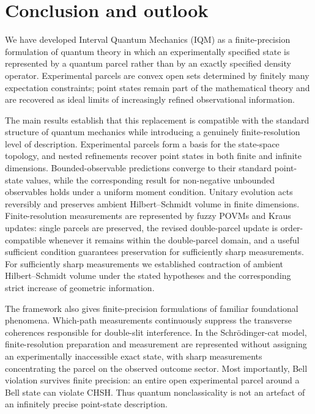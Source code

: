 \documentclass[11pt, onecolumn]{article}
\begin{document}
\section{Conclusion and outlook}
\label{sec:conclusion}

We have developed Interval Quantum Mechanics (IQM) as a finite-precision
formulation of quantum theory in which an experimentally specified state is
represented by a quantum parcel rather than by an exactly specified density
operator. Experimental parcels are convex open sets determined by finitely
many expectation constraints; point states remain part of the mathematical
theory and are recovered as ideal limits of increasingly refined
observational information.

The main results establish that this replacement is compatible with the
standard structure of quantum mechanics while introducing a genuinely
finite-resolution level of description. Experimental parcels form a basis
for the state-space topology, and nested refinements recover point states in
both finite and infinite dimensions. Bounded-observable predictions converge
to their standard point-state values, while the corresponding result for
non-negative unbounded observables holds under a uniform moment condition.
Unitary evolution acts reversibly and preserves ambient Hilbert--Schmidt
volume in finite dimensions. Finite-resolution measurements are represented
by fuzzy POVMs and Kraus updates: single parcels are preserved, the revised
double-parcel update is order-compatible whenever it remains within the
double-parcel domain, and a useful sufficient condition guarantees preservation for sufficiently sharp measurements.
For sufficiently sharp measurements we established contraction of ambient
Hilbert--Schmidt volume under the stated hypotheses and the corresponding
strict increase of geometric information.

The framework also gives finite-precision formulations of familiar
foundational phenomena. Which-path measurements continuously suppress the
transverse coherences responsible for double-slit interference. In the
Schr\"odinger-cat model, finite-resolution preparation and measurement are
represented without assigning an experimentally inaccessible exact state,
with sharp measurements concentrating the parcel on the observed outcome
sector. Most importantly, Bell violation survives finite precision: an
entire open experimental parcel around a Bell state can violate CHSH.
Thus quantum nonclassicality is not an artefact of an infinitely precise
point-state description.
\end{document}
